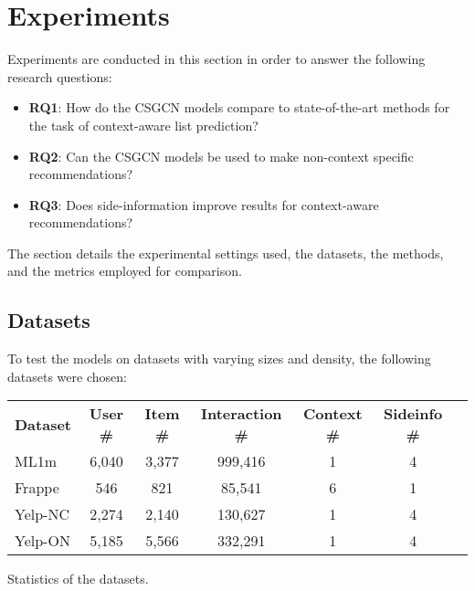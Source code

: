 \section{Experiments}\label{sec:experiments}
Experiments are conducted in this section in order to answer the following research questions:
\begin{itemize}
    \item \textbf{RQ1}: How do the CSGCN models compare to state-of-the-art methods for the task of context-aware list prediction?
    \item \textbf{RQ2}: Can the CSGCN models be used to make non-context specific recommendations?
    \item \textbf{RQ3}: Does side-information improve results for context-aware recommendations?
\end{itemize}
The section details the experimental settings used, the datasets, the methods, and the metrics employed for comparison.

\subsection{Datasets}\label{subsec:experimental-settings}
To test the models on datasets with varying sizes and density, the following datasets were chosen:\\

\begin{adjustwidth}{-2.5 cm}{-2.5 cm}\centering
\begin{threeparttable}[]
\scriptsize
\begin{tabular}{lcccccc}\toprule
\textbf{Dataset} &\textbf{User \#} &\textbf{Item \#} &\textbf{Interaction \#} &\textbf{Context \#} &\textbf{Sideinfo \#} \\\cmidrule{1-6}
ML1m &6,040 &3,377 &999,416 &1 &4 \\\cmidrule{1-6}
Frappe &546 & 821 &85,541 &6 &1 \\\cmidrule{1-6}
Yelp-NC &2,274 &2,140 &130,627 &1 &4 \\\cmidrule{1-6}
Yelp-ON &5,185 &5,566 &332,291 &1 &4 \\\midrule
\bottomrule
\end{tabular}
\caption{Statistics of the datasets.}\label{tab:datasetstats}
\end{threeparttable}
\end{adjustwidth}

